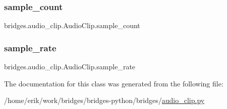 \subsubsection{\texorpdfstring{sample\+\_\+count}{sample\_count}}
{\footnotesize\ttfamily bridges.\+audio\+\_\+clip.\+Audio\+Clip.\+sample\+\_\+count}

\mbox{\label{classbridges_1_1audio__clip_1_1_audio_clip_a265e017578bdd94664f308f51b596c6d}} 
\subsubsection{\texorpdfstring{sample\+\_\+rate}{sample\_rate}}
{\footnotesize\ttfamily bridges.\+audio\+\_\+clip.\+Audio\+Clip.\+sample\+\_\+rate}



The documentation for this class was generated from the following file\+:\begin{DoxyCompactItemize}
\item 
/home/erik/work/bridges/bridges-\/python/bridges/\hyperlink{audio__clip_8py}{audio\+\_\+clip.\+py}\end{DoxyCompactItemize}
